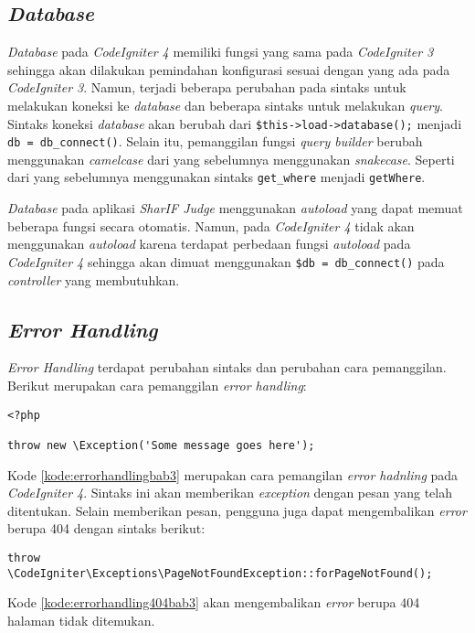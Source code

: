\subsection{\textit{Database}}
\textit{Database} pada \textit{CodeIgniter 4} memiliki fungsi yang sama pada \textit{CodeIgniter 3} sehingga akan dilakukan pemindahan konfigurasi sesuai dengan yang ada pada \textit{CodeIgniter 3}. Namun, terjadi beberapa perubahan pada sintaks untuk melakukan koneksi ke \textit{database} dan beberapa sintaks untuk melakukan \textit{query}. Sintaks koneksi \textit{database} akan berubah dari \texttt{\$this->load->database();} menjadi \texttt{db = db\_connect()}. Selain itu, pemanggilan fungsi \textit{query builder} berubah menggunakan \textit{camelcase} dari yang sebelumnya menggunakan \textit{snakecase}. Seperti dari yang sebelumnya menggunakan sintaks \texttt{get\_where} menjadi \texttt{getWhere}.

\textit{Database} pada aplikasi \textit{SharIF Judge} menggunakan \textit{autoload} yang dapat memuat beberapa fungsi secara otomatis. Namun, pada \textit{CodeIgniter 4}  tidak akan menggunakan \textit{autoload} karena terdapat perbedaan fungsi \textit{autoload} pada \textit{CodeIgniter 4} sehingga akan dimuat menggunakan \texttt{\$db = db\_connect()} pada \textit{controller} yang membutuhkan.

\subsection{\textit{Error Handling}}
\textit{Error Handling} terdapat perubahan sintaks dan perubahan cara pemanggilan. Berikut merupakan cara pemanggilan \textit{error handling}:
\begin{lstlisting}[caption=Contoh pemanggilan \textit{Error Handling} pada \textit{CodeIgniter 4}, label=kode:errorhandlingbab3]
<?php

throw new \Exception('Some message goes here');
\end{lstlisting}
Kode \ref{kode:errorhandlingbab3} merupakan cara pemangilan \textit{error hadnling} pada \textit{CodeIgniter 4}. Sintaks ini akan memberikan \textit{exception} dengan pesan yang telah ditentukan. Selain memberikan pesan, pengguna juga dapat mengembalikan \textit{error} berupa 404 dengan sintaks berikut:
\begin{lstlisting}[caption=Contoh pemanggilan \textit{Error Handling} 404 pada \textit{CodeIgniter 4}, label=kode:errorhandling404bab3]
throw \CodeIgniter\Exceptions\PageNotFoundException::forPageNotFound();
\end{lstlisting}
Kode \ref{kode:errorhandling404bab3} akan mengembalikan \textit{error} berupa 404 halaman tidak ditemukan.

